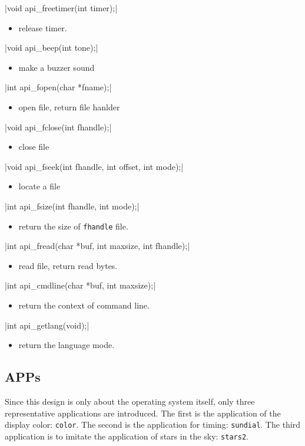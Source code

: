 \documentclass{swfcthesis}
\begin{document}
\csingle|void api_freetimer(int timer);|
\begin{itemize}
\item release timer.
\end{itemize}

\csingle|void api_beep(int tone);|
\begin{itemize}
\item make a buzzer sound
\end{itemize}

\csingle|int api_fopen(char *fname);|
\begin{itemize}
\item open file, return file hanlder
\end{itemize}

\csingle|void api_fclose(int fhandle);|
\begin{itemize}
\item close file
\end{itemize}

\csingle|void api_fseek(int fhandle, int offset, int mode);|
\begin{itemize}
\item locate a file
\end{itemize}

\csingle|int api_fsize(int fhandle, int mode);|
\begin{itemize}
\item return the size of \texttt{fhandle} file.
\end{itemize}

\csingle|int api_fread(char *buf, int maxsize, int fhandle);|
\begin{itemize}
\item read file, return read bytes. 
\end{itemize}

\csingle|int api_cmdline(char *buf, int maxsize);|
\begin{itemize}
\item return the context of command line.
\end{itemize}

\csingle|int api_getlang(void);|
\begin{itemize}
\item return the language mode.
\end{itemize}

\subsection{APPs}
\label{sec:apps-1}
Since this design is only about the operating system itself, only three representative
applications are introduced. The first is the application of the display color:
\texttt{color}. The second is the application for timing: \texttt{sundial}. The third
application is to imitate the application of stars in the sky: \texttt{stars2}.
\end{document}
